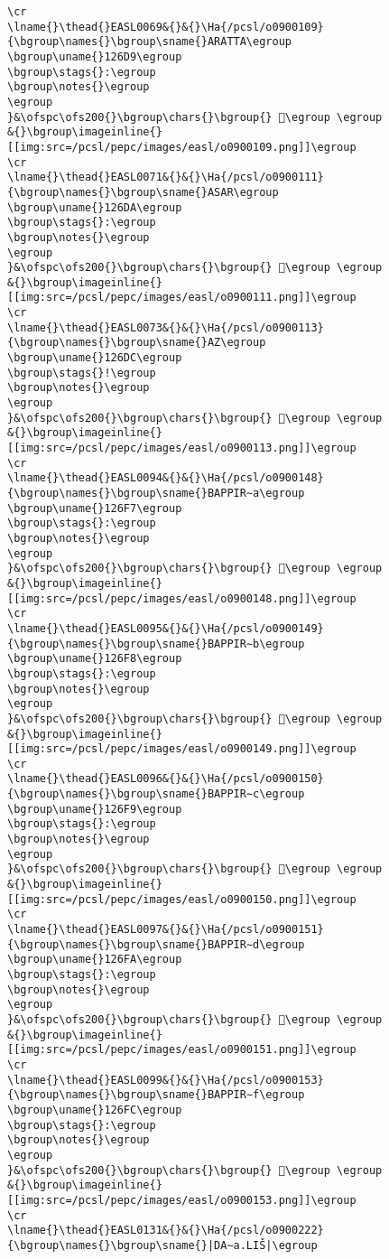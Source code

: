 \begin{verbatim}
\cr
\lname{}\thead{}EASL0069&{}&{}\Ha{/pcsl/o0900109}{\bgroup\names{}\bgroup\sname{}ARATTA\egroup
\bgroup\uname{}126D9\egroup
\bgroup\stags{}:\egroup
\bgroup\notes{}\egroup
\egroup
}&\ofspc\ofs200{}\bgroup\chars{}\bgroup{} 𒛙\egroup \egroup
&{}\bgroup\imageinline{}[[img:src=/pcsl/pepc/images/easl/o0900109.png]]\egroup
\cr
\lname{}\thead{}EASL0071&{}&{}\Ha{/pcsl/o0900111}{\bgroup\names{}\bgroup\sname{}ASAR\egroup
\bgroup\uname{}126DA\egroup
\bgroup\stags{}:\egroup
\bgroup\notes{}\egroup
\egroup
}&\ofspc\ofs200{}\bgroup\chars{}\bgroup{} 𒛚\egroup \egroup
&{}\bgroup\imageinline{}[[img:src=/pcsl/pepc/images/easl/o0900111.png]]\egroup
\cr
\lname{}\thead{}EASL0073&{}&{}\Ha{/pcsl/o0900113}{\bgroup\names{}\bgroup\sname{}AZ\egroup
\bgroup\uname{}126DC\egroup
\bgroup\stags{}!\egroup
\bgroup\notes{}\egroup
\egroup
}&\ofspc\ofs200{}\bgroup\chars{}\bgroup{} 𒛜\egroup \egroup
&{}\bgroup\imageinline{}[[img:src=/pcsl/pepc/images/easl/o0900113.png]]\egroup
\cr
\lname{}\thead{}EASL0094&{}&{}\Ha{/pcsl/o0900148}{\bgroup\names{}\bgroup\sname{}BAPPIR∼a\egroup
\bgroup\uname{}126F7\egroup
\bgroup\stags{}:\egroup
\bgroup\notes{}\egroup
\egroup
}&\ofspc\ofs200{}\bgroup\chars{}\bgroup{} 𒛷\egroup \egroup
&{}\bgroup\imageinline{}[[img:src=/pcsl/pepc/images/easl/o0900148.png]]\egroup
\cr
\lname{}\thead{}EASL0095&{}&{}\Ha{/pcsl/o0900149}{\bgroup\names{}\bgroup\sname{}BAPPIR∼b\egroup
\bgroup\uname{}126F8\egroup
\bgroup\stags{}:\egroup
\bgroup\notes{}\egroup
\egroup
}&\ofspc\ofs200{}\bgroup\chars{}\bgroup{} 𒛸\egroup \egroup
&{}\bgroup\imageinline{}[[img:src=/pcsl/pepc/images/easl/o0900149.png]]\egroup
\cr
\lname{}\thead{}EASL0096&{}&{}\Ha{/pcsl/o0900150}{\bgroup\names{}\bgroup\sname{}BAPPIR∼c\egroup
\bgroup\uname{}126F9\egroup
\bgroup\stags{}:\egroup
\bgroup\notes{}\egroup
\egroup
}&\ofspc\ofs200{}\bgroup\chars{}\bgroup{} 𒛹\egroup \egroup
&{}\bgroup\imageinline{}[[img:src=/pcsl/pepc/images/easl/o0900150.png]]\egroup
\cr
\lname{}\thead{}EASL0097&{}&{}\Ha{/pcsl/o0900151}{\bgroup\names{}\bgroup\sname{}BAPPIR∼d\egroup
\bgroup\uname{}126FA\egroup
\bgroup\stags{}:\egroup
\bgroup\notes{}\egroup
\egroup
}&\ofspc\ofs200{}\bgroup\chars{}\bgroup{} 𒛺\egroup \egroup
&{}\bgroup\imageinline{}[[img:src=/pcsl/pepc/images/easl/o0900151.png]]\egroup
\cr
\lname{}\thead{}EASL0099&{}&{}\Ha{/pcsl/o0900153}{\bgroup\names{}\bgroup\sname{}BAPPIR∼f\egroup
\bgroup\uname{}126FC\egroup
\bgroup\stags{}:\egroup
\bgroup\notes{}\egroup
\egroup
}&\ofspc\ofs200{}\bgroup\chars{}\bgroup{} 𒛼\egroup \egroup
&{}\bgroup\imageinline{}[[img:src=/pcsl/pepc/images/easl/o0900153.png]]\egroup
\cr
\lname{}\thead{}EASL0131&{}&{}\Ha{/pcsl/o0900222}{\bgroup\names{}\bgroup\sname{}|DA∼a.LIŠ|\egroup

\end{verbatim}
